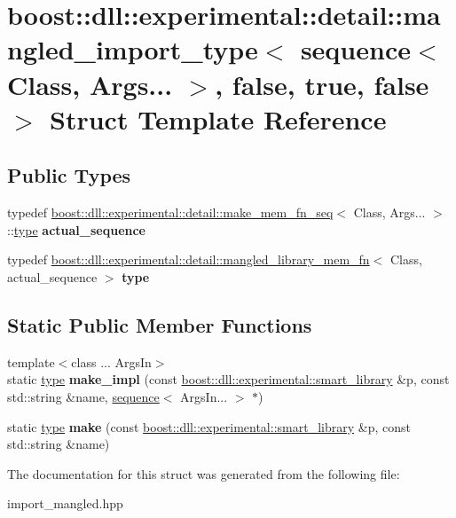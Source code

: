 \hypertarget{a01696}{}\section{boost\+:\+:dll\+:\+:experimental\+:\+:detail\+:\+:mangled\+\_\+import\+\_\+type$<$ sequence$<$ Class, Args... $>$, false, true, false $>$ Struct Template Reference}
\label{a01696}
\subsection*{Public Types}
\begin{DoxyCompactItemize}
\item 
\mbox{\label{a01696_a406057ae53728fce5596c851c965bd9b}} 
typedef \hyperlink{a01480}{boost\+::dll\+::experimental\+::detail\+::make\+\_\+mem\+\_\+fn\+\_\+seq}$<$ Class, Args... $>$\+::\hyperlink{a01672}{type} {\bfseries actual\+\_\+sequence}
\item 
\mbox{\label{a01696_ac6258fdfdf5b8122a71ea2460bbc879b}} 
typedef \hyperlink{a01672}{boost\+::dll\+::experimental\+::detail\+::mangled\+\_\+library\+\_\+mem\+\_\+fn}$<$ Class, actual\+\_\+sequence $>$ {\bfseries type}
\end{DoxyCompactItemize}
\subsection*{Static Public Member Functions}
\begin{DoxyCompactItemize}
\item 
\mbox{\label{a01696_a2e80b9257347fd592aea70c10d0d9d22}} 
{\footnotesize template$<$class ... Args\+In$>$ }\\static \hyperlink{a01672}{type} {\bfseries make\+\_\+impl} (const \hyperlink{a01712}{boost\+::dll\+::experimental\+::smart\+\_\+library} \&p, const std\+::string \&name, \hyperlink{a01432}{sequence}$<$ Args\+In... $>$ $\ast$)
\item 
\mbox{\label{a01696_aa5ecb76aa04d873ef520d01cc3bdbb7b}} 
static \hyperlink{a01672}{type} {\bfseries make} (const \hyperlink{a01712}{boost\+::dll\+::experimental\+::smart\+\_\+library} \&p, const std\+::string \&name)
\end{DoxyCompactItemize}


The documentation for this struct was generated from the following file\+:\begin{DoxyCompactItemize}
\item 
import\+\_\+mangled.\+hpp\end{DoxyCompactItemize}
